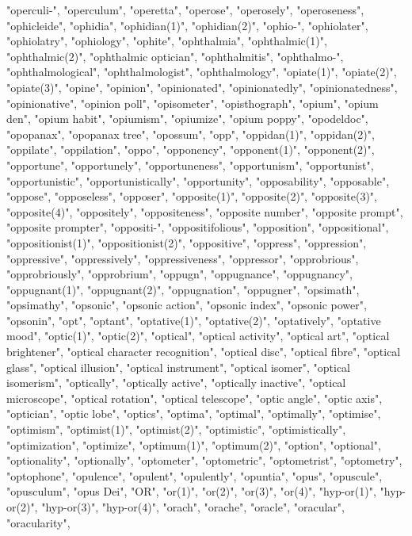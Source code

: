 "operculi-",
"operculum",
"operetta",
"operose",
"operosely",
"operoseness",
"ophicleide",
"ophidia",
"ophidian(1)",
"ophidian(2)",
"ophio-",
"ophiolater",
"ophiolatry",
"ophiology",
"ophite",
"ophthalmia",
"ophthalmic(1)",
"ophthalmic(2)",
"ophthalmic optician",
"ophthalmitis",
"ophthalmo-",
"ophthalmological",
"ophthalmologist",
"ophthalmology",
"opiate(1)",
"opiate(2)",
"opiate(3)",
"opine",
"opinion",
"opinionated",
"opinionatedly",
"opinionatedness",
"opinionative",
"opinion poll",
"opisometer",
"opisthograph",
"opium",
"opium den",
"opium habit",
"opiumism",
"opiumize",
"opium poppy",
"opodeldoc",
"opopanax",
"opopanax tree",
"opossum",
"opp",
"oppidan(1)",
"oppidan(2)",
"oppilate",
"oppilation",
"oppo",
"opponency",
"opponent(1)",
"opponent(2)",
"opportune",
"opportunely",
"opportuneness",
"opportunism",
"opportunist",
"opportunistic",
"opportunistically",
"opportunity",
"opposability",
"opposable",
"oppose",
"opposeless",
"opposer",
"opposite(1)",
"opposite(2)",
"opposite(3)",
"opposite(4)",
"oppositely",
"oppositeness",
"opposite number",
"opposite prompt",
"opposite prompter",
"oppositi-",
"oppositifolious",
"opposition",
"oppositional",
"oppositionist(1)",
"oppositionist(2)",
"oppositive",
"oppress",
"oppression",
"oppressive",
"oppressively",
"oppressiveness",
"oppressor",
"opprobrious",
"opprobriously",
"opprobrium",
"oppugn",
"oppugnance",
"oppugnancy",
"oppugnant(1)",
"oppugnant(2)",
"oppugnation",
"oppugner",
"opsimath",
"opsimathy",
"opsonic",
"opsonic action",
"opsonic index",
"opsonic power",
"opsonin",
"opt",
"optant",
"optative(1)",
"optative(2)",
"optatively",
"optative mood",
"optic(1)",
"optic(2)",
"optical",
"optical activity",
"optical art",
"optical brightener",
"optical character recognition",
"optical disc",
"optical fibre",
"optical glass",
"optical illusion",
"optical instrument",
"optical isomer",
"optical isomerism",
"optically",
"optically active",
"optically inactive",
"optical microscope",
"optical rotation",
"optical telescope",
"optic angle",
"optic axis",
"optician",
"optic lobe",
"optics",
"optima",
"optimal",
"optimally",
"optimise",
"optimism",
"optimist(1)",
"optimist(2)",
"optimistic",
"optimistically",
"optimization",
"optimize",
"optimum(1)",
"optimum(2)",
"option",
"optional",
"optionality",
"optionally",
"optometer",
"optometric",
"optometrist",
"optometry",
"optophone",
"opulence",
"opulent",
"opulently",
"opuntia",
"opus",
"opuscule",
"opusculum",
"opus Dei",
"OR",
"or(1)",
"or(2)",
"or(3)",
"or(4)",
"hyp-or(1)",
"hyp-or(2)",
"hyp-or(3)",
"hyp-or(4)",
"orach",
"orache",
"oracle",
"oracular",
"oracularity",
